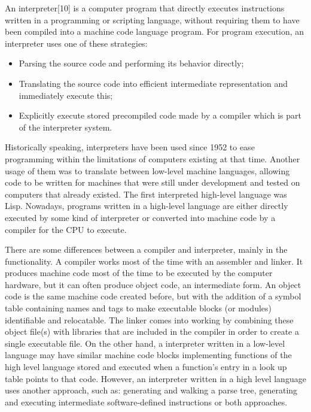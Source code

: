 \documentclass[12pt,a4paper,twoside]{report}
\begin{document}
An interpreter[10] is a computer program that directly executes instructions written in a programming or scripting language, without requiring them to have been compiled into a machine code language program. For program execution, an interpreter uses one of these strategies:

\begin{itemize}
	\item Parsing the source code and performing its behavior directly;
	\item Translating the source code into efficient intermediate representation and immediately execute this;
	\item Explicitly execute stored precompiled code made by a compiler which is part of the interpreter system.
\end{itemize}

Historically speaking, interpreters have been used since 1952 to ease programming within the limitations of computers existing at that time. Another usage of them was to translate between low-level machine languages, allowing code to be written for machines that were still under development and tested on computers that already existed. The first interpreted high-level language was Lisp. Nowadays, programs written in a high-level language are either directly executed by some kind of interpreter or converted into machine code by a compiler for the CPU to execute.

There are some differences between a compiler and interpreter, mainly in the functionality. A compiler works most of the time with an assembler and linker. It produces machine code most of the time to be executed by the computer hardware, but it can often produce object code, an intermediate form. An object code is the same machine code created before, but with the addition of a symbol table containing names and tags to make executable blocks (or modules) identifiable and relocatable. The linker comes into working by combining these object file(s) with libraries that are included in the compiler in order to create a single executable file. On the other hand, a interpreter written in a low-level language may have similar machine code blocks implementing functions of the high level language stored and executed when a function's entry in a look up table points to that code. However, an interpreter written in a high level language uses another approach, such as: generating and walking a parse tree, generating and executing intermediate software-defined instructions or both approaches.
\end{document}
